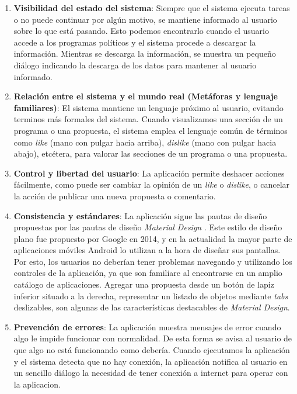 \begin{enumerate}
  \item \textbf{Visibilidad del estado del sistema}: Siempre que el sistema ejecuta tareas o no puede continuar por algún motivo, se mantiene informado al usuario sobre lo que está pasando. Esto podemos encontrarlo cuando el usuario accede a los programas políticos y el sistema procede a descargar la información. Mientras se descarga la información, se muestra un pequeño diálogo indicando la descarga de los datos para mantener al usuario informado.
  \item \textbf{Relación entre el sistema y el mundo real (Metáforas y lenguaje familiares)}: El sistema mantiene un lenguaje próximo al usuario, evitando terminos más formales del sistema. Cuando visualizamos una sección de un programa o una propuesta, el sistema emplea el lenguaje común de términos como \textit{like} (mano con pulgar hacia arriba), \textit{dislike} (mano con pulgar hacia abajo), etcétera, para valorar las secciones de un programa o una propuesta.
  \item \textbf{Control y libertad del usuario}: La aplicación permite deshacer acciones fácilmente, como puede ser cambiar la opinión de un \textit{like} o \textit{dislike}, o cancelar la acción de publicar una nueva propuesta o comentario.
  \item \textbf{Consistencia y estándares}: La aplicación sigue las pautas de diseño propuestas por las pautas de diseño \textit{Material Design} \cite{ref:materialdesign}. Este estilo de diseño plano fue propuesto por Google en 2014, y en la actualidad la mayor parte de aplicaciones móviles Android lo utilizan a la hora de diseñar sus pantallas. Por esto, los usuarios no deberían tener problemas navegando y utilizando los controles de la aplicación, ya que son familiare al encontrarse en un amplio catálogo de aplicaciones. Agregar una propuesta desde un botón de lapiz inferior situado a la derecha, representar un listado de objetos mediante \textit{tabs} deslizables, son algunas de las características destacables de \textit{Material Design}.
  \item \textbf{Prevención de errores}: La aplicación muestra mensajes de error cuando algo le impide funcionar con normalidad. De esta forma se avisa al usuario de que algo no está funcionando como debería. Cuando ejecutamos la aplicación y el sistema detecta que no hay conexión, la aplicación notifica al usuario en un sencillo diálogo la necesidad de tener conexión a internet para operar con la aplicacion.

\end{enumerate}
